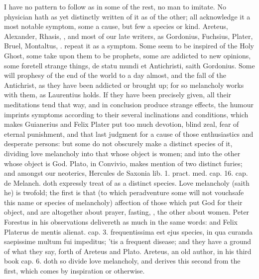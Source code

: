 {I have no pattern to follow as in some of the rest, no man to imitate.
No physician hath as yet distinctly written of it as of the other; all
acknowledge it a most notable symptom, some a cause, but few a species
or kind. Areteus, Alexander, Rhasis, \Avicenna{}, and most of our
late writers, as Gordonius, Fuchsius, Plater, Bruel, Montaltus, \etc{}.
repeat it as a symptom. Some seem to be inspired of the Holy
Ghost, some take upon them to be prophets, some are addicted to new
opinions, some foretell strange things, de statu mundi et Antichristi,
saith Gordonius. Some will prophesy of the end of the world to a day
almost, and the fall of the Antichrist, as they have been addicted or
brought up; for so melancholy works with them, as Laurentius
holds. If they have been precisely given, all their meditations tend
that way, and in conclusion produce strange effects, the humour
imprints symptoms according to their several inclinations and
conditions, which makes Guianerius and Felix Plater put too
much devotion, blind zeal, fear of eternal punishment, and that last
judgment for a cause of those enthusiastics and desperate persons: but
some do not obscurely make a distinct species of it, dividing love
melancholy into that whose object is women; and into the other whose
object is God. Plato, in Convivio, makes mention of two distinct
furies; and amongst our neoterics, Hercules de Saxonia lib. 1. pract.
med. cap. 16. cap. de Melanch. doth expressly treat of as a distinct%
species.  Love melancholy (saith he) is twofold; the first is
that (to which peradventure some will not vouchsafe this name or
species of melancholy) affection of those which put God for their
object, and are altogether about prayer, fasting, \etc{}, the other about
women. Peter Forestus in his observations delivereth as much in the
same words: and Felix Platerus de mentis alienat. cap. 3.
frequentissima est ejus species, in qua curanda saepissime multum fui
impeditus; 'tis a frequent disease; and they have a ground of what they
say, forth of Areteus and Plato. Areteus, an old author, in his
third book cap. 6. doth so divide love melancholy, and derives this
second from the first, which comes by inspiration or otherwise.

}

